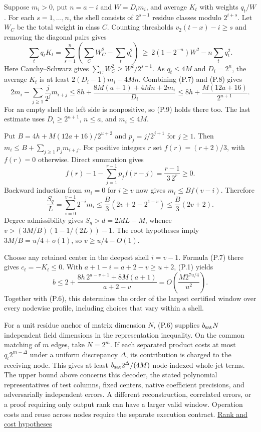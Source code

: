 \documentclass[
  11pt,
]{article}
\begin{document}
Suppose \(m_i>0\), put \(n=a-i\) and \(W=D_i m_i\), and average \(K_t\)
with weights \(q_t/W\). For each \(s=1,\ldots,n\), the shell consists of
\(2^{s-1}\) residue classes modulo \(2^{i+s}\). Let \(W_C\) be the total
weight in class \(C\). Counting thresholds \(v_2(t-x)-i\ge s\) and
removing the diagonal pairs gives \[
 \sum_t q_t K_t
 =\sum_{s=1}^n\left(\sum_C W_C^2-\sum_t q_t^2\right)
 \ \ge\ 2(1-2^{-n})W^2-n\sum_tq_t^2.                     \tag{P.8}
\] Here Cauchy--Schwarz gives \(\sum_C W_C^2\ge W^2/2^{s-1}\). As
\(q_t\le4M\) and \(D_i=2^n\), the average \(K_t\) is at least
\(2(D_i-1)m_i-4Mn\). Combining (P.7) and (P.8) gives \[
 2m_i-\sum_{j\ge1}\frac j{2^j}m_{i+j}
 \le 8h+\frac{8M(a+1)+4Mn+2m_i}{D_i}
 \le 8h+\frac{M(12a+16)}{2^{u+1}} .                        \tag{P.9}
\] For an empty shell the left side is nonpositive, so (P.9) holds there
too. The last estimate uses \(D_i\ge 2^{u+1}\), \(n\le a\), and
\(m_i\le4M\).

Put \(B=4h+M(12a+16)/2^{u+2}\) and \(p_j=j/2^{j+1}\) for \(j\ge1\). Then
\(m_i\le B+\sum_{j\ge1}p_jm_{i+j}\). For positive integers \(r\) set
\(f(r)=(r+2)/3\), with \(f(r)=0\) otherwise. Direct summation gives \[
 f(r)-1-\sum_{j=1}^{r-1}p_j f(r-j)=\frac{r-1}{3\,2^r}\ge0 .
\] Backward induction from \(m_i=0\) for \(i\ge v\) now gives
\(m_i\le Bf(v-i)\). Therefore \[
 \frac{S_q}{L}=\sum_{i=0}^{v-1}2^{-i}m_i
 \le \frac B3(2v+2-2^{1-v})\le\frac B3(2v+2).
\] Degree admissibility gives \(S_q>d=2ML-M\), whence
\(v>(3M/B)(1-1/(2L))-1\). The root hypotheses imply \(3M/B=u/4+o(1)\),
so \(v\ge u/4-O(1)\).

Choose any retained center in the deepest shell \(i=v-1\). Formula (P.7)
there gives \(c_t=-K_t\le0\). With \(a+1-i=a+2-v\ge u+2\), (P.1) yields
\[
 b\le 2+\frac{8h\,2^{a-v+1}+8M(a+1)}{a+2-v}
    = O\!\left(\frac{M2^{7u/4}}{u^2}\right).
\] Together with (P.6), this determines the order of the largest
certified window over every nodewise profile, including choices that
vary within a shell.

For a unit residue anchor of matrix dimension \(N\), (P.6) supplies
\(b_{\rm sat}N\) independent field dimensions in the representation
inequality. On the common matching of \(m\) edges, take \(N=2^m\). If
each separated product costs at most \(q_t2^{m-\Delta}\) under a uniform
discrepancy \(\Delta\), its contribution is charged to the receiving
node. This gives at least \(b_{\rm sat}2^\Delta/(4M)\) node-indexed
whole-jet terms. The upper bound above concerns this decoder, the stated
polynomial representatives of test columns, fixed centers, native
coefficient precisions, and adversarially independent errors. A
different reconstruction, correlated errors, or a proof requiring only
output rank can have a larger valid window. Operation costs and reuse
across nodes require the separate execution contract.
\href{https://github.com/dch-and-Elara/some-research-inspired-by-openais-eth-preprint/tree/main/rank-budget-barriers}{Rank and cost hypotheses}
\end{document}
